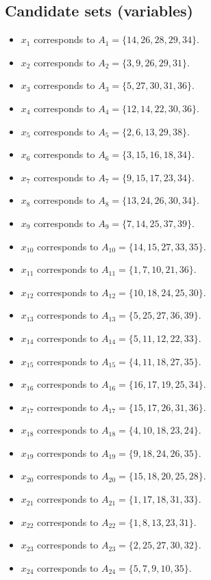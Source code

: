 \documentclass[11pt]{article}
\begin{document}
\subsection*{Candidate sets (variables)}
\begin{itemize}
\item $x_{1}$ corresponds to $A_{1}=\{14, 26, 28, 29, 34\}$.
\item $x_{2}$ corresponds to $A_{2}=\{3, 9, 26, 29, 31\}$.
\item $x_{3}$ corresponds to $A_{3}=\{5, 27, 30, 31, 36\}$.
\item $x_{4}$ corresponds to $A_{4}=\{12, 14, 22, 30, 36\}$.
\item $x_{5}$ corresponds to $A_{5}=\{2, 6, 13, 29, 38\}$.
\item $x_{6}$ corresponds to $A_{6}=\{3, 15, 16, 18, 34\}$.
\item $x_{7}$ corresponds to $A_{7}=\{9, 15, 17, 23, 34\}$.
\item $x_{8}$ corresponds to $A_{8}=\{13, 24, 26, 30, 34\}$.
\item $x_{9}$ corresponds to $A_{9}=\{7, 14, 25, 37, 39\}$.
\item $x_{10}$ corresponds to $A_{10}=\{14, 15, 27, 33, 35\}$.
\item $x_{11}$ corresponds to $A_{11}=\{1, 7, 10, 21, 36\}$.
\item $x_{12}$ corresponds to $A_{12}=\{10, 18, 24, 25, 30\}$.
\item $x_{13}$ corresponds to $A_{13}=\{5, 25, 27, 36, 39\}$.
\item $x_{14}$ corresponds to $A_{14}=\{5, 11, 12, 22, 33\}$.
\item $x_{15}$ corresponds to $A_{15}=\{4, 11, 18, 27, 35\}$.
\item $x_{16}$ corresponds to $A_{16}=\{16, 17, 19, 25, 34\}$.
\item $x_{17}$ corresponds to $A_{17}=\{15, 17, 26, 31, 36\}$.
\item $x_{18}$ corresponds to $A_{18}=\{4, 10, 18, 23, 24\}$.
\item $x_{19}$ corresponds to $A_{19}=\{9, 18, 24, 26, 35\}$.
\item $x_{20}$ corresponds to $A_{20}=\{15, 18, 20, 25, 28\}$.
\item $x_{21}$ corresponds to $A_{21}=\{1, 17, 18, 31, 33\}$.
\item $x_{22}$ corresponds to $A_{22}=\{1, 8, 13, 23, 31\}$.
\item $x_{23}$ corresponds to $A_{23}=\{2, 25, 27, 30, 32\}$.
\item $x_{24}$ corresponds to $A_{24}=\{5, 7, 9, 10, 35\}$.

\end{itemize}
\end{document}
